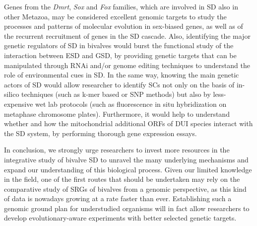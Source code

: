 \documentclass[../main.tex]{subfiles}
\begin{document}
Genes from the \textit{Dmrt}, \textit{Sox} and \textit{Fox} families, which are involved in SD also in other Metazoa, may be considered excellent genomic targets to study the processes and patterns of molecular evolution in sex-biased genes, as well as of the recurrent recruitment of genes in the SD cascade. Also, identifying the major genetic regulators of SD in bivalves would burst the functional study of the interaction between ESD and GSD, by providing genetic targets that can be manipulated through RNAi and/or genome editing techniques to understand the role of environmental cues in SD. In the same way, knowing the main genetic actors of SD would allow researcher to identify SCs not only on the basis of in-silico techniques (such as k-mer based or SNP methods) but also by less-expensive wet lab protocols (such as fluorescence in situ hybridization on metaphase chromosome plates). Furthermore, it would help to understand whether and how the mitochondrial additional ORFs of DUI species interact with the SD system, by performing thorough gene expression essays.

In conclusion, we strongly urge researchers to invest more resources in the integrative study of bivalve SD to unravel the many underlying mechanisms and expand our understanding of this biological process. Given our limited knowledge in the field, one of the first routes that should be undertaken may rely on the comparative study of SRGs of bivalves from a genomic perspective, as this kind of data is nowadays growing at a rate faster than ever. Establishing such a genomic ground plan for understudied organisms will in fact allow researchers to develop evolutionary-aware experiments with better selected genetic targets.
\end{document}
